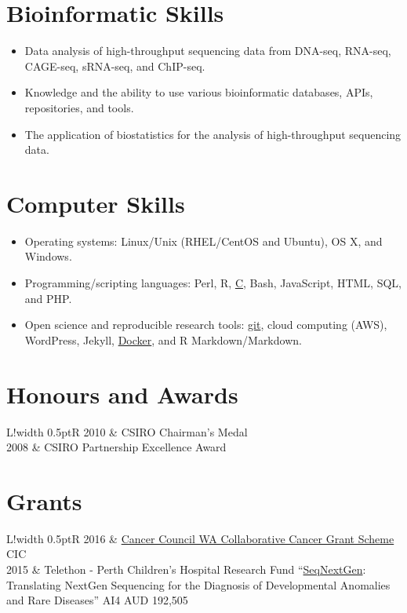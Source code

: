 \documentclass[a4paper, 10pt]{article}
\newcommand\VRule{\color{lightgray}\vrule width 0.5pt}
\begin{document}
\section*{Bioinformatic Skills}

\begin{itemize}
   \setlength\itemsep{0em}
   \item Data analysis of high-throughput sequencing data from DNA-seq, RNA-seq, CAGE-seq, sRNA-seq, and ChIP-seq.
   \item Knowledge and the ability to use various bioinformatic databases, APIs, repositories, and tools.
   \item The application of biostatistics for the analysis of high-throughput sequencing data.
\end{itemize}

\section*{Computer Skills}

\begin{itemize}
   \setlength\itemsep{0em}
   \item Operating systems: Linux/Unix (RHEL/CentOS and Ubuntu), OS X, and Windows.
   \item Programming/scripting languages: Perl, R, \href{https://github.com/davetang/getting_started_with_c}{C}, Bash, JavaScript, HTML, SQL, and PHP.
   \item Open science and reproducible research tools: \href{https://github.com/davetang/getting_started_with_git}{git}, cloud computing (AWS), WordPress, Jekyll, \href{https://github.com/davetang/learning_docker/}{Docker}, and R Markdown/Markdown.
\end{itemize}

\section*{Honours and Awards}
\begin{tabular}{L!{\VRule}R}
   2010 & CSIRO Chairman's Medal \\
   2008 & CSIRO Partnership Excellence Award \\
\end{tabular}

\section*{Grants}
\begin{tabular}{L!{\VRule}R}
   2016 & \href{https://www.cancerwa.asn.au/research/funding/collaborative_cancer_grant_scheme/}{Cancer Council WA Collaborative Cancer Grant Scheme} CIC \\
   2015 & Telethon - Perth Children's Hospital Research Fund ``\href{http://telethonkids.org.au/our-research/projects-index/g/genetics-seqnextgen-translating-nextgen-sequencing-for-the-diagnosis-of-developmental-anomalies-and-rare-diseases/}{SeqNextGen}: Translating NextGen Sequencing for the Diagnosis of Developmental Anomalies and Rare Diseases'' AI4 AUD 192,505 \\
\end{tabular}
\end{document}
